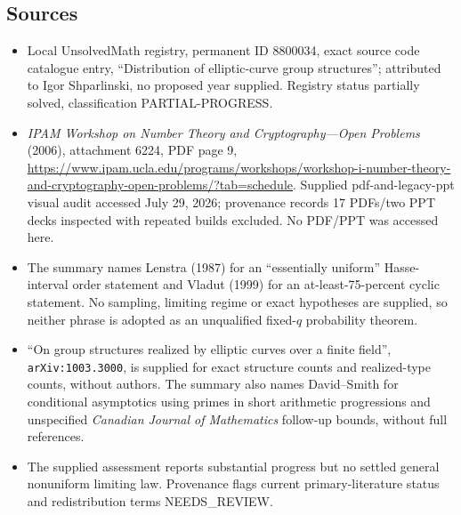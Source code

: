 \documentclass[11pt]{article}
\begin{document}
\subsection{Sources}
\begin{itemize}
\item Local UnsolvedMath registry, permanent ID 8800034, exact source code catalogue entry, ``Distribution of elliptic-curve group structures''; attributed to Igor Shparlinski, no proposed year supplied. Registry status partially solved, classification PARTIAL-PROGRESS.
\item \emph{IPAM Workshop on Number Theory and Cryptography---Open Problems} (2006), attachment 6224, PDF page 9, \url{https://www.ipam.ucla.edu/programs/workshops/workshop-i-number-theory-and-cryptography-open-problems/?tab=schedule}. Supplied pdf-and-legacy-ppt visual audit accessed July 29, 2026; provenance records 17 PDFs/two PPT decks inspected with repeated builds excluded. No PDF/PPT was accessed here.
\item The summary names Lenstra (1987) for an ``essentially uniform'' Hasse-interval order statement and Vladut (1999) for an at-least-75-percent cyclic statement. No sampling, limiting regime or exact hypotheses are supplied, so neither phrase is adopted as an unqualified fixed-$q$ probability theorem.
\item ``On group structures realized by elliptic curves over a finite field'', \texttt{arXiv:1003.3000}, is supplied for exact structure counts and realized-type counts, without authors. The summary also names David--Smith for conditional asymptotics using primes in short arithmetic progressions and unspecified \emph{Canadian Journal of Mathematics} follow-up bounds, without full references.
\item The supplied assessment reports substantial progress but no settled general nonuniform limiting law. Provenance flags current primary-literature status and redistribution terms NEEDS\_REVIEW.
\end{itemize}
\end{document}

